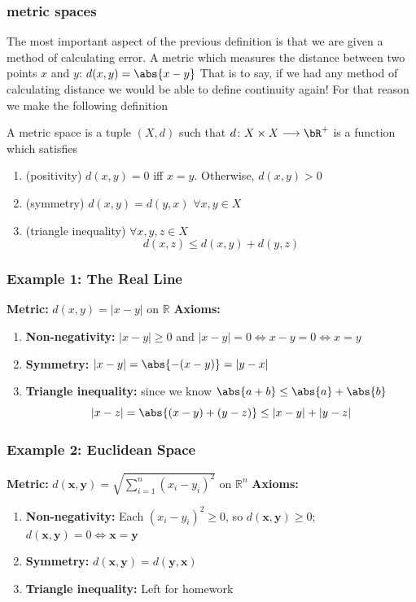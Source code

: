 \documentclass{beamer}
\begin{document}

\begin{frame}
    \frametitle{metric spaces}

    The most important aspect of the previous definition is that we are given a method of calculating error. A \alert{metric} which
    measures the distance between two points $x$ and $y$: $d(x, y) = \abs{x-y}$ \pause That is to say, if we had any method of calculating
    distance we would be able to define continuity again! \pause For that reason we make the following definition
    \begin{definition}
        A \alert{metric space} is a tuple $(X, d)$ such that $d\colon X\times X\longrightarrow\bR^+$ is a function which satisfies
        \begin{enumerate}
            \item (positivity) $d(x, y) = 0$ iff $x=y$. Otherwise, $d(x, y)>0$
            \item (symmetry) $d(x, y) = d(y, x)$ $\forall x, y\in X$
            \item (triangle inequality) $\forall x, y, z\in X$
            \[d(x, z) \leq d(x, y) + d(y, z)\]
        \end{enumerate}
    \end{definition}

\end{frame}

\begin{frame}
    \frametitle{Example 1: The Real Line}
    \textbf{Metric:} $d(x, y) = |x - y|$ on $\mathbb{R}$
    \newline
    \textbf{Axioms:} \pause
    \begin{enumerate}
        \item \textbf{Non-negativity:} $|x-y| \geq 0$ and $|x-y| = 0 \iff x-y = 0 \iff x = y$ \pause
        \item \textbf{Symmetry:} $|x-y| = \abs{-(x-y)} = |y-x|$ \pause
        \item \textbf{Triangle inequality:} since we know $\abs{a+b}\leq\abs{a}+\abs{b}$
        \[|x-z| = \abs{(x-y)+(y-z)} \leq |x-y| + |y-z|\]
    \end{enumerate}
\end{frame}

\begin{frame}
    \frametitle{Example 2: Euclidean Space}
    \textbf{Metric:} $d(\mathbf{x}, \mathbf{y}) = \sqrt{\sum_{i=1}^n (x_i - y_i)^2}$ on $\mathbb{R}^n$\pause
    \newline
    \textbf{Axioms:}
    \begin{enumerate}
        \item \textbf{Non-negativity:} Each $(x_i - y_i)^2 \geq 0$, so $d(\mathbf{x}, \mathbf{y}) \geq 0$; $d(\mathbf{x}, \mathbf{y}) = 0 \iff \mathbf{x} = \mathbf{y}$ \pause
        \item \textbf{Symmetry:} $d(\mathbf{x}, \mathbf{y}) = d(\mathbf{y}, \mathbf{x})$\pause
        \item \textbf{Triangle inequality:} Left for homework
    \end{enumerate}
\end{frame}
\end{document}
